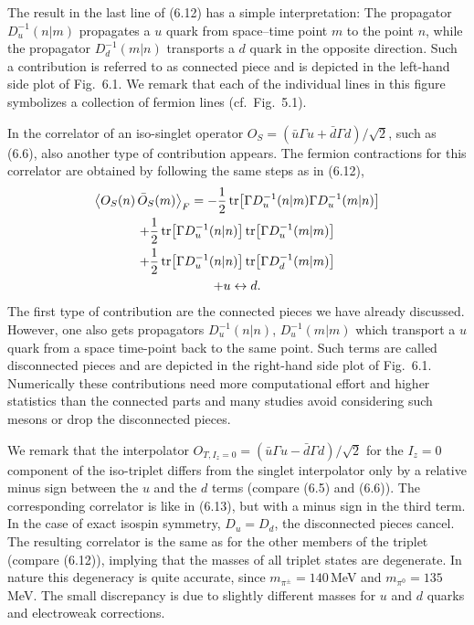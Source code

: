 The result in the last line of (6.12) has a simple interpretation: The
propagator $D_u^{-1}(n|m)$ propagates a $u$ quark from space--time point $m$ to
the point $n$, while the propagator $D_d^{-1}(m|n)$ transports a $d$ quark in
the opposite direction. Such a contribution is referred to as connected piece
and is depicted in the left-hand side plot of Fig.~6.1. We remark that each of
the individual lines in this figure symbolizes a collection of fermion lines
(cf.\ Fig.~5.1).

In the correlator of an iso-singlet operator $O_S = (\bar u\Gamma u +
\bar d\Gamma d)/\sqrt{2}$, such as (6.6), also another type of contribution
appears. The fermion contractions for this correlator are obtained by following
the same steps as in (6.12),
\begin{multline}
  \big\langle O_S(n)\, \bar{O}_S(m) \big\rangle_F
  = -\frac{1}{2}\operatorname{tr}\!\left[ \Gamma D_u^{-1}(n|m)\Gamma D_u^{-1}(m|n) \right] \\
  + \frac{1}{2}\operatorname{tr}\!\left[ \Gamma D_u^{-1}(n|n) \right]
    \operatorname{tr}\!\left[ \Gamma D_u^{-1}(m|m) \right] \\
  + \frac{1}{2}\operatorname{tr}\!\left[ \Gamma D_u^{-1}(n|n) \right]
    \operatorname{tr}\!\left[ \Gamma D_d^{-1}(m|m) \right] \\
  + u \leftrightarrow d .
\end{multline}
The first type of contribution are the connected pieces we have already
discussed. However, one also gets propagators $D_u^{-1}(n|n)$,
$D_u^{-1}(m|m)$ which transport a $u$ quark from a space time-point back to the
same point. Such terms are called disconnected pieces and are depicted in the
right-hand side plot of Fig.~6.1. Numerically these contributions need more
computational effort and higher statistics than the connected parts and many
studies avoid considering such mesons or drop the disconnected pieces.

We remark that the interpolator $O_{T,I_z=0} = (\bar u\Gamma u - \bar d\Gamma
d)/\sqrt{2}$ for the $I_z = 0$ component of the iso-triplet differs from the
singlet interpolator only by a relative minus sign between the $u$ and the $d$
terms (compare (6.5) and (6.6)). The corresponding correlator is like in
(6.13), but with a minus sign in the third term. In the case of exact isospin
symmetry, $D_u = D_d$, the disconnected pieces cancel. The resulting correlator
is the same as for the other members of the triplet (compare (6.12)), implying
that the masses of all triplet states are degenerate. In nature this
degeneracy is quite accurate, since $m_{\pi^\pm} = 140$\,MeV and $m_{\pi^0} =
135$\,MeV. The small discrepancy is due to slightly different masses for $u$
and $d$ quarks and electroweak corrections.

